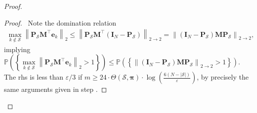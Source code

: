 \begin{proof}
        \begin{proof}
            \pf\ Note the domination relation
            \begin{align*}
                \underset{k \notin \mathcal{S}}{\max} \left \| \mathbf{P}_\mathcal{S} \mathbf{M}^{\top} \mathbf{e}_k \right \|_2 \leq \left \| \mathbf{P}_\mathcal{S} \mathbf{M}^{\top} \left ( \mathbf{I}_N - \mathbf{P}_\mathcal{S} \right ) \right \|_{2 \to 2} = \left \| \left ( \mathbf{I}_N - \mathbf{P}_\mathcal{S} \right ) \mathbf{M} \mathbf{P}_\mathcal{S}  \right \|_{2 \to 2},
            \end{align*}
            implying $\mathbb{P} \left ( \left \{  \underset{k \notin \mathcal{S}}{\max} \left \| \mathbf{P}_\mathcal{S} \mathbf{M}^{\top} \mathbf{e}_k \right \|_2 > 1 \right \}\right ) \leq \mathbb{P} \left ( \left \{  \left \| \left ( \mathbf{I}_N - \mathbf{P}_\mathcal{S} \right ) \mathbf{M} \mathbf{P}_\mathcal{S}  \right \|_{2 \to 2} > 1 \right \}\right )$. The \acrlong{rhs} is less than $\varepsilon / 3$ if $m \geq 24 \cdot \Theta (\mathcal{S}, \bm{\pi}) \cdot \log \left ( \frac{6 (N - |\mathcal{S}|)}{\varepsilon} \right )$, by precisely the same arguments given in step .
            \qedsymbol
        \end{proof}


\end{proof}

